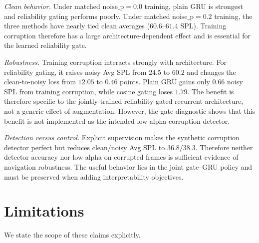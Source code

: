 \documentclass[conference]{IEEEtran}
\begin{document}
\emph{Clean behavior.} Under matched $\mathrm{noise\_p}{=}0.0$ training, plain GRU is strongest and reliability gating performs poorly. Under matched $\mathrm{noise\_p}{=}0.2$ training, the three methods have nearly tied clean averages ($60.6$--$61.4$ SPL). Training corruption therefore has a large architecture-dependent effect and is essential for the learned reliability gate.

\emph{Robustness.} Training corruption interacts strongly with architecture.
For reliability gating, it raises noisy Avg SPL from $24.5$ to $60.2$ and
changes the clean-to-noisy loss from $12.05$ to $0.46$ points. Plain GRU gains
only $0.66$ noisy SPL from training corruption, while cosine gating loses
$1.79$. The benefit is therefore specific to the jointly trained
reliability-gated recurrent architecture, not a generic effect of
augmentation. However, the gate diagnostic shows that this benefit is not
implemented as the intended low-alpha corruption detector.

\emph{Detection versus control.} Explicit supervision makes the synthetic
corruption detector perfect but reduces clean/noisy Avg SPL to $36.8/38.3$.
Therefore neither detector accuracy nor low alpha on corrupted frames is
sufficient evidence of navigation robustness. The useful behavior lies in the
joint gate--GRU policy and must be preserved when adding interpretability
objectives.

\section{Limitations}
\label{sec:limitations}
We state the scope of these claims explicitly.
\end{document}
